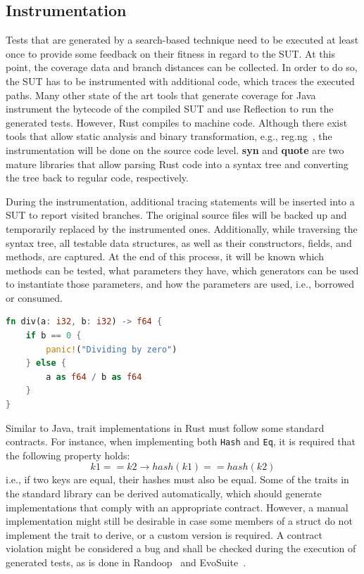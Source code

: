 \documentclass{article}
\begin{document}
\subsection{Instrumentation}
Tests that are generated by a search-based technique need to be executed at least once to provide some feedback on their fitness in regard to the \ac{SUT}. At this point, the coverage data and branch distances can be collected. In order to do so, the \ac{SUT} has to be instrumented with additional code, which traces the executed paths. Many other state of the art tools that generate coverage for Java instrument the bytecode of the compiled \ac{SUT} and use Reflection to run the generated tests. However, Rust compiles to machine code. Although there exist tools that allow static analysis and binary transformation, e.g., reg.ng~\cite{DiFederico2018}, the instrumentation will be done on the source code level. \textbf{syn} and \textbf{quote} are two mature libraries that allow parsing Rust code into a syntax tree and converting the tree back to regular code, respectively.

During the instrumentation, additional tracing statements will be inserted into a \ac{SUT} to report visited branches. The original source files will be backed up and temporarily replaced by the instrumented ones. Additionally, while traversing the syntax tree, all testable data structures, as well as their constructors, fields, and methods, are captured. At the end of this process, it will be known which methods can be tested, what parameters they have, which generators can be used to instantiate those parameters, and how the parameters are used, i.e., borrowed or consumed.

\begin{lstlisting}[language=Rust, style=boxed, caption=Division by zero transformation, label=lst:example-testability-transformation]
fn div(a: i32, b: i32) -> f64 {
    if b == 0 {
        panic!("Dividing by zero")
    } else {
        a as f64 / b as f64
    }
}
\end{lstlisting}

Similar to Java, trait implementations in Rust must follow some standard contracts. For instance, when implementing both \lstinline{Hash} and \lstinline{Eq}, it is required that the following property holds:
\[
k1 == k2 \longrightarrow hash(k1) == hash(k2)
\]
i.e., if two keys are equal, their hashes must also be equal. Some of the traits in the standard library can be derived automatically, which should generate implementations that comply with an appropriate contract. However, a manual implementation might still be desirable in case some members of a struct do not implement the trait to derive, or a custom version is required. A contract violation might be considered a bug and shall be checked during the execution of generated tests, as is done in Randoop~\cite{Pacheco_2007} and EvoSuite~\cite{Fraser2013}.
\end{document}

